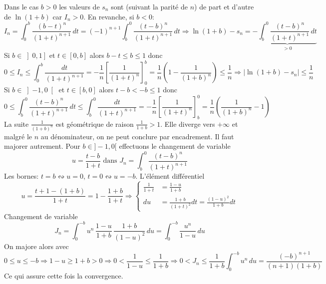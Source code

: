 Dans le cas $b>0$ les valeurs de $s_n$ sont (suivant la parité de $n$) de part et d'autre de $\ln(1+b)$ car $I_n >0$.\newline
En revanche, si $b<0$:
\begin{displaymath}
  I_n =\int_0^b\frac{(b-t)^n}{(1+t)^{n+1}}\, dt
  = (-1)^{n+1}\int_b^0\frac{(t-b)^n}{(1+t)^{n+1}}\, dt
\Rightarrow
\ln(1+b) - s_n = - \underset{>0}{\underbrace{\int_b^0\frac{(t-b)^n}{(1+t)^{n+1}}\, dt}}
\end{displaymath}
Si $b\in \left]0,1 \right]$  et $t\in \left[0,b \right]$ alors $b-t\leq b \leq 1$ donc
\begin{displaymath}
  0\leq I_n \leq \int_0^b \frac{dt}{(1+t)^{n+1}} = -\frac{1}{n}\left[ \frac{1}{(1+t)^n}\right]_0^b = \frac{1}{n}\left(1-\frac{1}{(1+b)^n} \right)
  \leq \frac{1}{n}
\Rightarrow |\ln(1+b) - s_n| \leq \frac{1}{n}  
\end{displaymath}
Si $b \in \left]-1,0 \right[$ et $t\in \left[b,0 \right]$ alors $t-b < -b \leq 1$ donc
\begin{displaymath}
0 \leq \int_b^0\frac{(t-b)^n}{(1+t)^{n+1}}\, dt \leq \int_b^0\frac{dt}{(1+t)^{n+1}}
= -\frac{1}{n}\left[ \frac{1}{(1+t)^n}\right]_b^0
= \frac{1}{n}\left( \frac{1}{(1+b)^n} - 1\right) 
\end{displaymath}
La suite $\frac{1}{(1+b)^n}$ est géométrique de raison $\frac{1}{1+b}>1$. Elle diverge vers $+\infty$ et malgré le $n$ au dénominateur, on ne peut conclure par encadrement. Il faut majorer autrement.\newline
Pour $b \in ]-1,0[$ effectuons le changement de variable 
\begin{displaymath}
u = \frac{t-b}{1+t} \text{ dans } J_n = \int_b^0 \frac{(t-b)^n}{(1+t)^{n+1}}
\end{displaymath}
Les bornes: $t=b \leftrightsquigarrow u=0$, $t=0 \leftrightsquigarrow u=-b$.\newline
L'élément différentiel
\begin{displaymath}
u = \frac{t+1 -(1+b)}{1+t} = 1-\frac{1+b}{1+t}
\Rightarrow
\left\lbrace 
\begin{aligned}
\frac{1}{1+t}&=\frac{1-u}{1+b} \\
du &= \frac{1+b}{(1+t)^2}dt = \frac{(1-u)^2}{1+b}dt
\end{aligned}
\right. 
\end{displaymath}
Changement de variable
\begin{displaymath}
J_n = \int_0^{-b}u^n\, \frac{1-u}{1+b}\, \frac{1+b}{(1-u)^2}\,du = \int_0^{-b}\frac{u^n}{1-u}\, du
\end{displaymath}
On majore alors avec
\begin{displaymath}
  0\leq u \leq -b \Rightarrow 1- u \geq 1+b >0 \Rightarrow 0 < \frac{1}{1-u}\leq \frac{1}{1+b}
\Rightarrow
0<J_n \leq \frac{1}{1+b}\int_0^{-b}u^n\,du = \frac{(-b)^{n+1}}{(n+1)(1+b)}
\end{displaymath}
Ce qui assure cette fois la convergence.

